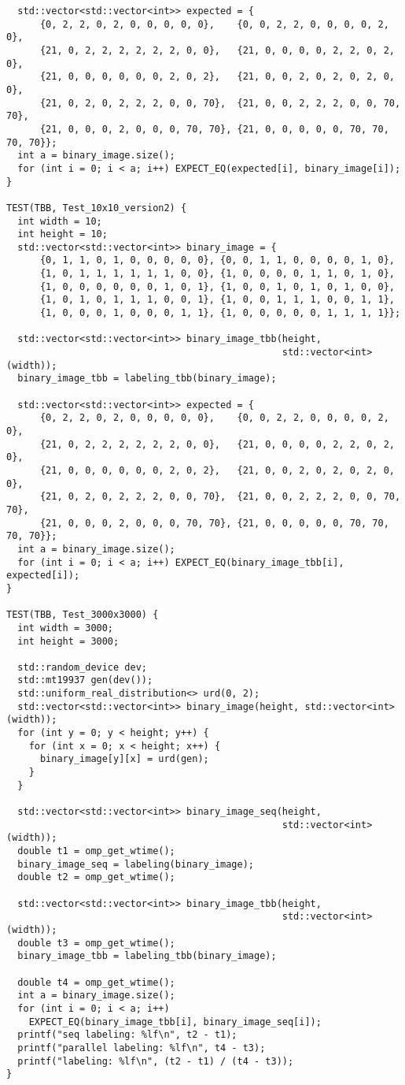 \documentclass[12pt]{article}
\begin{document}
\begin{lstlisting}
  std::vector<std::vector<int>> expected = {
      {0, 2, 2, 0, 2, 0, 0, 0, 0, 0},    {0, 0, 2, 2, 0, 0, 0, 0, 2, 0},
      {21, 0, 2, 2, 2, 2, 2, 2, 0, 0},   {21, 0, 0, 0, 0, 2, 2, 0, 2, 0},
      {21, 0, 0, 0, 0, 0, 0, 2, 0, 2},   {21, 0, 0, 2, 0, 2, 0, 2, 0, 0},
      {21, 0, 2, 0, 2, 2, 2, 0, 0, 70},  {21, 0, 0, 2, 2, 2, 0, 0, 70, 70},
      {21, 0, 0, 0, 2, 0, 0, 0, 70, 70}, {21, 0, 0, 0, 0, 0, 70, 70, 70, 70}};
  int a = binary_image.size();
  for (int i = 0; i < a; i++) EXPECT_EQ(expected[i], binary_image[i]);
}

TEST(TBB, Test_10x10_version2) {
  int width = 10;
  int height = 10;
  std::vector<std::vector<int>> binary_image = {
      {0, 1, 1, 0, 1, 0, 0, 0, 0, 0}, {0, 0, 1, 1, 0, 0, 0, 0, 1, 0},
      {1, 0, 1, 1, 1, 1, 1, 1, 0, 0}, {1, 0, 0, 0, 0, 1, 1, 0, 1, 0},
      {1, 0, 0, 0, 0, 0, 0, 1, 0, 1}, {1, 0, 0, 1, 0, 1, 0, 1, 0, 0},
      {1, 0, 1, 0, 1, 1, 1, 0, 0, 1}, {1, 0, 0, 1, 1, 1, 0, 0, 1, 1},
      {1, 0, 0, 0, 1, 0, 0, 0, 1, 1}, {1, 0, 0, 0, 0, 0, 1, 1, 1, 1}};

  std::vector<std::vector<int>> binary_image_tbb(height,
                                                 std::vector<int>(width));
  binary_image_tbb = labeling_tbb(binary_image);

  std::vector<std::vector<int>> expected = {
      {0, 2, 2, 0, 2, 0, 0, 0, 0, 0},    {0, 0, 2, 2, 0, 0, 0, 0, 2, 0},
      {21, 0, 2, 2, 2, 2, 2, 2, 0, 0},   {21, 0, 0, 0, 0, 2, 2, 0, 2, 0},
      {21, 0, 0, 0, 0, 0, 0, 2, 0, 2},   {21, 0, 0, 2, 0, 2, 0, 2, 0, 0},
      {21, 0, 2, 0, 2, 2, 2, 0, 0, 70},  {21, 0, 0, 2, 2, 2, 0, 0, 70, 70},
      {21, 0, 0, 0, 2, 0, 0, 0, 70, 70}, {21, 0, 0, 0, 0, 0, 70, 70, 70, 70}};
  int a = binary_image.size();
  for (int i = 0; i < a; i++) EXPECT_EQ(binary_image_tbb[i], expected[i]);
}

TEST(TBB, Test_3000x3000) {
  int width = 3000;
  int height = 3000;

  std::random_device dev;
  std::mt19937 gen(dev());
  std::uniform_real_distribution<> urd(0, 2);
  std::vector<std::vector<int>> binary_image(height, std::vector<int>(width));
  for (int y = 0; y < height; y++) {
    for (int x = 0; x < height; x++) {
      binary_image[y][x] = urd(gen);
    }
  }

  std::vector<std::vector<int>> binary_image_seq(height,
                                                 std::vector<int>(width));
  double t1 = omp_get_wtime();
  binary_image_seq = labeling(binary_image);
  double t2 = omp_get_wtime();

  std::vector<std::vector<int>> binary_image_tbb(height,
                                                 std::vector<int>(width));
  double t3 = omp_get_wtime();
  binary_image_tbb = labeling_tbb(binary_image);

  double t4 = omp_get_wtime();
  int a = binary_image.size();
  for (int i = 0; i < a; i++)
    EXPECT_EQ(binary_image_tbb[i], binary_image_seq[i]);
  printf("seq labeling: %lf\n", t2 - t1);
  printf("parallel labeling: %lf\n", t4 - t3);
  printf("labeling: %lf\n", (t2 - t1) / (t4 - t3));
}
\end{lstlisting}
\end{document}
